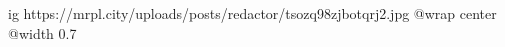  
 
 
 
 

\ifcmt
  ig https://mrpl.city/uploads/posts/redactor/tsozq98zjbotqrj2.jpg
  @wrap center
  @width 0.7
\fi
